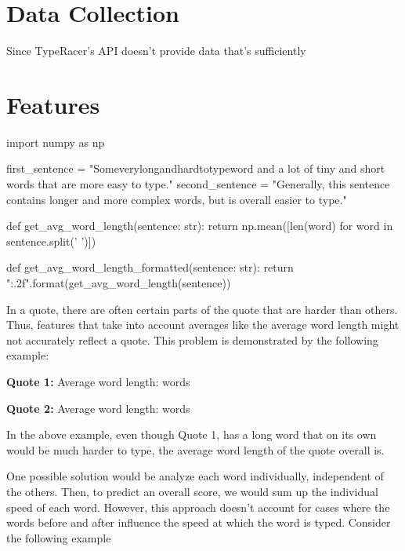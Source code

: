 \documentclass{article}
\newenvironment{zeroindent}
  {\par\setlength{\parindent}{0pt}}
  {\par}
\begin{document}
\section{Data Collection}
Since TypeRacer's API doesn't provide data that's sufficiently

\section{Features}

\begin{pycode}
import numpy as np

first_sentence = "Someverylongandhardtotypeword and a lot of tiny and short words that are more easy to type."
second_sentence = "Generally, this sentence contains longer and more complex words, but is overall easier to type."

def get_avg_word_length(sentence: str):
	return np.mean([len(word) for word in sentence.split(' ')])

def get_avg_word_length_formatted(sentence: str):
	return "{:.2f}".format(get_avg_word_length(sentence))
\end{pycode}

In a quote, there are often certain parts of the quote that are harder than others. Thus, features that take into account averages like the average word length might not accurately reflect a quote. This problem is demonstrated by the following example:

\medskip

\begin{zeroindent}
	\textbf{Quote 1:} 
	\newline
	Average word length:  words

	\smallskip

	\textbf{Quote 2:} 
	\newline
	Average word length:  words
\end{zeroindent}

\medskip

In the above example, even though Quote 1, has a long word that on its own would be much harder to type, the average word length of the quote overall is.

One possible solution would be analyze each word individually, independent of the others. Then, to predict an overall score, we would sum up the individual speed of each word. However, this approach doesn't account for cases where the words before and after influence the speed at which the word is typed. Consider the following example
\end{document}
